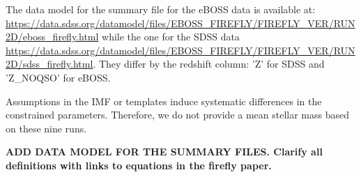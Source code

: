 \documentclass[onecolumn]{aa}
\begin{document}
The data model for the summary file for the eBOSS data is available at: 
\url{https://data.sdss.org/datamodel/files/EBOSS_FIREFLY/FIREFLY_VER/RUN2D/eboss_firefly.html} while the one for the SDSS data \url{https://data.sdss.org/datamodel/files/EBOSS_FIREFLY/FIREFLY_VER/RUN2D/sdss_firefly.html}.
They differ by the redshift column: 'Z' for SDSS and 'Z\_NOQSO' for eBOSS.  

Assumptions in the IMF or templates induce systematic differences in the constrained parameters. 
Therefore, we do not provide a mean stellar mass based on these nine runs.


\textbf{ADD DATA MODEL FOR THE SUMMARY FILES. Clarify all definitions with links to equations in the firefly paper.}
\end{document}
